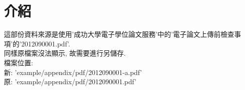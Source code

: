 
\section{介紹}
這部份資料來源是使用'成功大學電子學位論文服務'中的'電子論文上傳前檢查事項'的'2012090001.pdf'.\\

同樣原檔案沒法顯示, 故需要進行另儲存.\\

\noindent 檔案位置:\\
\noindent 新: 'example/appendix/pdf/2012090001-a.pdf'\\
\noindent 原: 'example/appendix/pdf/2012090001.pdf'\\



\EndChapter
